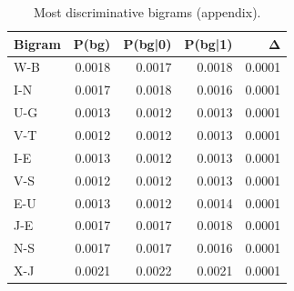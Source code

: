 \begin{table}
\caption{Most discriminative bigrams (appendix).}
\label{tab:top_bigrams}
\begin{tabular}{lrrrr}
\toprule
Bigram & P(bg) & P(bg|0) & P(bg|1) & Δ \\
\midrule
W-B & 0.0018 & 0.0017 & 0.0018 & 0.0001 \\
I-N & 0.0017 & 0.0018 & 0.0016 & 0.0001 \\
U-G & 0.0013 & 0.0012 & 0.0013 & 0.0001 \\
V-T & 0.0012 & 0.0012 & 0.0013 & 0.0001 \\
I-E & 0.0013 & 0.0012 & 0.0013 & 0.0001 \\
V-S & 0.0012 & 0.0012 & 0.0013 & 0.0001 \\
E-U & 0.0013 & 0.0012 & 0.0014 & 0.0001 \\
J-E & 0.0017 & 0.0017 & 0.0018 & 0.0001 \\
N-S & 0.0017 & 0.0017 & 0.0016 & 0.0001 \\
X-J & 0.0021 & 0.0022 & 0.0021 & 0.0001 \\
\bottomrule
\end{tabular}
\end{table}
